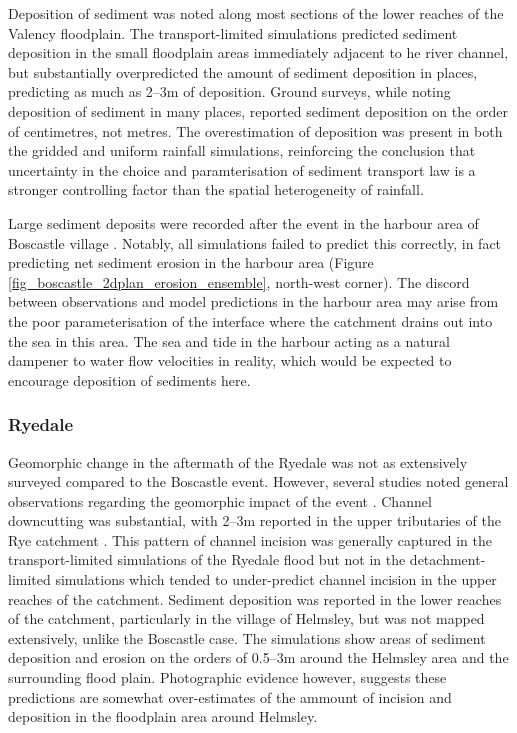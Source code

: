Deposition of sediment was noted along most sections of the lower reaches of the Valency floodplain. The transport-limited simulations predicted sediment deposition in the small floodplain areas immediately adjacent to he river channel, but substantially overpredicted the amount of sediment deposition in places, predicting as much as 2--3m of deposition. Ground surveys, while noting deposition of sediment in many places, reported sediment deposition on the order of centimetres, not metres. The overestimation of deposition was present in both the gridded and uniform rainfall simulations, reinforcing the conclusion that uncertainty in the choice and paramterisation of sediment transport law is a stronger controlling factor than the spatial heterogeneity of rainfall.

Large sediment deposits were recorded after the event in the harbour area of Boscastle village \citep{wallingford2005flooding}. Notably, all simulations failed to predict this correctly, in fact predicting net sediment erosion in the harbour area (Figure \ref{fig_boscastle_2dplan_erosion_ensemble}, north-west corner). The discord between observations and model predictions in the harbour area may arise from the poor parameterisation of the interface where the catchment drains out into the sea in this area. The sea and tide in the harbour acting as a natural dampener to water flow velocities in reality, which would be expected to encourage deposition of sediments here.

\subsubsection{Ryedale}

Geomorphic change in the aftermath of the Ryedale was not as extensively surveyed compared to the Boscastle event. However, several studies noted general observations regarding the geomorphic impact of the event \citep{dong2006evaluation,wass2008investigation,hopkins2012knowledge}.
Channel downcutting was substantial, with 2--3m reported in the upper tributaries of the Rye catchment \citep{wass2008investigation,hopkins2012knowledge}. This pattern of channel incision was generally captured in the transport-limited simulations of the Ryedale flood but not in the detachment-limited simulations which tended to under-predict channel incision in the upper reaches of the catchment. Sediment deposition was reported in the lower reaches of the catchment, particularly in the village of Helmsley, but was not mapped extensively, unlike the Boscastle case. The simulations show areas of sediment deposition and erosion on the orders of 0.5--3m around the Helmsley area and the surrounding flood plain. Photographic evidence \citep{dong2006evaluation,hopkins2012knowledge} however, suggests these predictions are somewhat over-estimates of the ammount of incision and deposition in the floodplain area around Helmsley.

